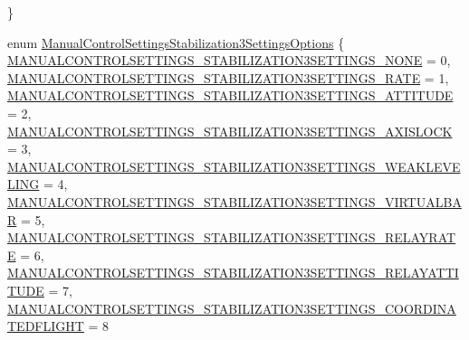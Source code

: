 \begin{DoxyCompactItemize}
 \}
\item 
enum \hyperlink{group___manual_control_settings_ga022bccb0b45cda0b0285ee9a25266767}{\-Manual\-Control\-Settings\-Stabilization3\-Settings\-Options} \{ \*
\hyperlink{group___manual_control_settings_gga022bccb0b45cda0b0285ee9a25266767a7f1df55606ed3814e4051ce7df038439}{\-M\-A\-N\-U\-A\-L\-C\-O\-N\-T\-R\-O\-L\-S\-E\-T\-T\-I\-N\-G\-S\-\_\-\-S\-T\-A\-B\-I\-L\-I\-Z\-A\-T\-I\-O\-N3\-S\-E\-T\-T\-I\-N\-G\-S\-\_\-\-N\-O\-N\-E} = 0, 
\hyperlink{group___manual_control_settings_gga022bccb0b45cda0b0285ee9a25266767a8caff3f079083c169e9470930add996b}{\-M\-A\-N\-U\-A\-L\-C\-O\-N\-T\-R\-O\-L\-S\-E\-T\-T\-I\-N\-G\-S\-\_\-\-S\-T\-A\-B\-I\-L\-I\-Z\-A\-T\-I\-O\-N3\-S\-E\-T\-T\-I\-N\-G\-S\-\_\-\-R\-A\-T\-E} = 1, 
\hyperlink{group___manual_control_settings_gga022bccb0b45cda0b0285ee9a25266767ab9c23b69fb33880605e69571374e7890}{\-M\-A\-N\-U\-A\-L\-C\-O\-N\-T\-R\-O\-L\-S\-E\-T\-T\-I\-N\-G\-S\-\_\-\-S\-T\-A\-B\-I\-L\-I\-Z\-A\-T\-I\-O\-N3\-S\-E\-T\-T\-I\-N\-G\-S\-\_\-\-A\-T\-T\-I\-T\-U\-D\-E} = 2, 
\hyperlink{group___manual_control_settings_gga022bccb0b45cda0b0285ee9a25266767a6776b2549803d334f26eb75eddc59974}{\-M\-A\-N\-U\-A\-L\-C\-O\-N\-T\-R\-O\-L\-S\-E\-T\-T\-I\-N\-G\-S\-\_\-\-S\-T\-A\-B\-I\-L\-I\-Z\-A\-T\-I\-O\-N3\-S\-E\-T\-T\-I\-N\-G\-S\-\_\-\-A\-X\-I\-S\-L\-O\-C\-K} = 3, 
\*
\hyperlink{group___manual_control_settings_gga022bccb0b45cda0b0285ee9a25266767ae4ff1227fcee03f1470499db9c3a34d5}{\-M\-A\-N\-U\-A\-L\-C\-O\-N\-T\-R\-O\-L\-S\-E\-T\-T\-I\-N\-G\-S\-\_\-\-S\-T\-A\-B\-I\-L\-I\-Z\-A\-T\-I\-O\-N3\-S\-E\-T\-T\-I\-N\-G\-S\-\_\-\-W\-E\-A\-K\-L\-E\-V\-E\-L\-I\-N\-G} = 4, 
\hyperlink{group___manual_control_settings_gga022bccb0b45cda0b0285ee9a25266767a9646f04a84e532a0de019c4b2972c673}{\-M\-A\-N\-U\-A\-L\-C\-O\-N\-T\-R\-O\-L\-S\-E\-T\-T\-I\-N\-G\-S\-\_\-\-S\-T\-A\-B\-I\-L\-I\-Z\-A\-T\-I\-O\-N3\-S\-E\-T\-T\-I\-N\-G\-S\-\_\-\-V\-I\-R\-T\-U\-A\-L\-B\-A\-R} = 5, 
\hyperlink{group___manual_control_settings_gga022bccb0b45cda0b0285ee9a25266767a60551e04a5d320025bda42d182273940}{\-M\-A\-N\-U\-A\-L\-C\-O\-N\-T\-R\-O\-L\-S\-E\-T\-T\-I\-N\-G\-S\-\_\-\-S\-T\-A\-B\-I\-L\-I\-Z\-A\-T\-I\-O\-N3\-S\-E\-T\-T\-I\-N\-G\-S\-\_\-\-R\-E\-L\-A\-Y\-R\-A\-T\-E} = 6, 
\hyperlink{group___manual_control_settings_gga022bccb0b45cda0b0285ee9a25266767a452f2a92f19ff06dcc84bc383ef080c5}{\-M\-A\-N\-U\-A\-L\-C\-O\-N\-T\-R\-O\-L\-S\-E\-T\-T\-I\-N\-G\-S\-\_\-\-S\-T\-A\-B\-I\-L\-I\-Z\-A\-T\-I\-O\-N3\-S\-E\-T\-T\-I\-N\-G\-S\-\_\-\-R\-E\-L\-A\-Y\-A\-T\-T\-I\-T\-U\-D\-E} = 7, 
\*
\hyperlink{group___manual_control_settings_gga022bccb0b45cda0b0285ee9a25266767a23f56343d22dd99e258275a9192571ef}{\-M\-A\-N\-U\-A\-L\-C\-O\-N\-T\-R\-O\-L\-S\-E\-T\-T\-I\-N\-G\-S\-\_\-\-S\-T\-A\-B\-I\-L\-I\-Z\-A\-T\-I\-O\-N3\-S\-E\-T\-T\-I\-N\-G\-S\-\_\-\-C\-O\-O\-R\-D\-I\-N\-A\-T\-E\-D\-F\-L\-I\-G\-H\-T} = 8

\end{DoxyCompactItemize}
